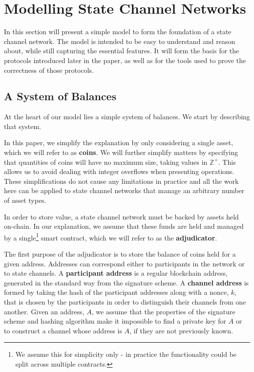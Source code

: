 
\section{Modelling State Channel Networks}\label{sec:modelling}

In this section will present a simple model to form the foundation of a state channel network.
The model is intended to be easy to understand and reason about, while still capturing the essential features.
It will form the basis for the protocols introduced later in the paper, as well as for the tools used to prove the correctness of those protocols.

\subsection{A System of Balances}

At the heart of our model lies a simple system of balances. 
We start by describing that system.

In this paper, we simplify the explanation by only considering a single asset, which we will refer to as \textbf{coins}.
We will further simplify matters by specifying that quantities of coins will have no maximum
size, taking values in $\mathbb{Z}^+$.
This allows us to avoid dealing with integer overflows when presenting operations.
These simplifications do not cause any limitations in practice and all the work
here can be applied to state channel networks that manage an arbitrary number of asset types.

In order to store value, a state channel network must be backed by assets held on-chain.
In our explanation, we assume that these funds are held and managed by a single\footnote{
  We assume this for simplicity only - in practice the functionality could be split across multiple contracts.
} smart contract,
which we will refer to as the \textbf{adjudicator}.

The first purpose of the adjudicator is to store the balance of coins held for a given address.
Addresses can correspond either to participants in the network or to state channels.
A \textbf{participant address} is a regular blockchain address, generated in the standard way from the signature scheme.
A \textbf{channel address} is formed by taking the hash of the participant addresses along with a nonce, $k$, that is chosen by the participants in order to distinguish their channels from one another.
Given an address, $A$, we assume that the properties of the signature scheme and hashing algorithm make it impossible to find a private key for $A$ or to construct a channel whose address is $A$, if they are not previously known.

